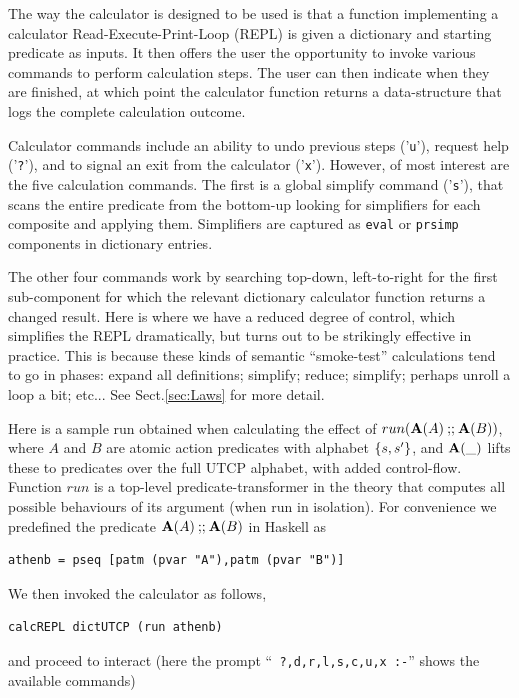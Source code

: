 The way the calculator is designed to be used is
that a function implementing a calculator Read-Execute-Print-Loop (REPL)
is given a dictionary and starting predicate as inputs.
It then offers the user the opportunity to invoke various
commands to perform calculation steps.
The user can then indicate when they are finished,
at which point the calculator function returns
a data-structure that logs the complete calculation outcome.

Calculator commands include an ability to undo previous steps ('\texttt{u}'),
request help ('\texttt{?}'),
and to signal an exit from the calculator ('\texttt{x}').
However,
of most interest are the five calculation commands.
The first is a global simplify command ('\texttt{s}'),
that scans the entire predicate from the bottom-up
looking for simplifiers for each composite and applying them.
Simplifiers are captured as \texttt{eval} or \texttt{prsimp} components
in dictionary entries.

The other four commands work by searching top-down, left-to-right for
the first sub-component for which the relevant dictionary calculator
function returns a changed result.
Here is where we have a reduced degree of control,
which simplifies the REPL dramatically,
but turns out to be strikingly effective in practice.
This is because these kinds of semantic ``smoke-test'' calculations
tend to go in phases: expand all definitions; simplify; reduce; simplify;
perhaps unroll a loop a bit; etc...
See Sect.\ref{sec:Laws} for more detail.


Here is a sample run obtained when calculating the effect of $run(\mathbf{A}(A) \mathbin{\mathbf{;\!;}} \mathbf{A}(B))$,
where $A$ and $B$ are atomic action predicates with alphabet $\{{s,s'}\}$,
and $\mathbf{A}(\_)$ lifts these to predicates over the full UTCP alphabet,
with added control-flow.
Function $run$ is a top-level predicate-transformer in the theory that computes
all possible behaviours of its argument (when run in isolation).
For convenience we predefined the predicate $\mathbf{A}(A) \mathbin{\mathbf{;\!;}} \mathbf{A}(B)$ in Haskell as
\begin{verbatim}
athenb = pseq [patm (pvar "A"),patm (pvar "B")]
\end{verbatim}
We then invoked the calculator as follows,
\begin{verbatim}
calcREPL dictUTCP (run athenb)
\end{verbatim}
and proceed to interact
(here the prompt  ``\texttt{ ?,d,r,l,s,c,u,x :-}''
shows the available commands)

